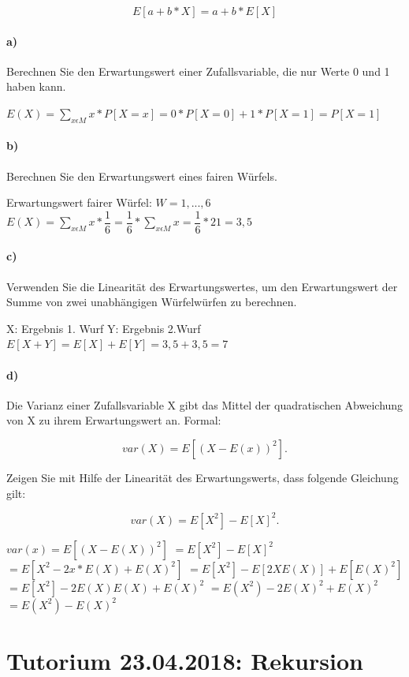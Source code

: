 \documentclass[paper=a4, fontsize=11pt]{scrartcl}
\numberwithin{equation}{section}
\numberwithin{figure}{section}
\numberwithin{table}{section}
\begin{document}
$$E[a+b*X] = a+b * E[X]$$

\paragraph{a)}
Berechnen Sie den Erwartungswert einer Zufallsvariable, die nur Werte 0 und 1 haben kann.

$E(X) = \sum_{x \epsilon M} x * P[X = x] = 0*P [X=0]+1*P[X=1]=P[X=1]$ 

\paragraph{b)}
Berechnen Sie den Erwartungswert eines fairen Würfels.

Erwartungswert fairer Würfel: $W={1,...,6}$
$E(X)= \sum_{x \epsilon M} x * \dfrac{1}{6} = \dfrac{1}{6} * \sum_{x \epsilon M} x = \dfrac{1}{6} * 21 = 3,5$

\paragraph{c)}
Verwenden Sie die Linearität des Erwartungswertes, um den Erwartungswert der Summe von zwei unabhängigen Würfelwürfen zu berechnen.

X: Ergebnis 1. Wurf
Y: Ergebnis 2.Wurf
$E[X+Y] = E[X]+E[Y] = 3,5 + 3,5 = 7$

\paragraph{d)}
Die Varianz einer Zufallsvariable X gibt das Mittel der quadratischen Abweichung von X zu ihrem Erwartungswert an. Formal:

$$var(X) = E[(X-E(x))^{2}].$$

Zeigen Sie mit Hilfe der Linearität des Erwartungswerts, dass folgende Gleichung gilt:

$$var(X) = E[X^{2}] - E[X]^{2}.$$

$var(x) = E [(X-E(X))^{2}]$
$= E[X^{2}] - E[X]^{2}$
$= E[X^{2}-2x*E(X)+E(X)^{2}]$
$= E[X^{2}]-E[2XE(X)]+E[E(X)^{2}]$
$= E[X^{2}]-2E(X)E(X)+E(X)^{2}$
$= E(X^{2})-2E(X)^{2}+E(X)^{2}$
$=E(X^{2})-E(X)^{2}$

\newpage
\section{Tutorium 23.04.2018: Rekursion}
\end{document}
